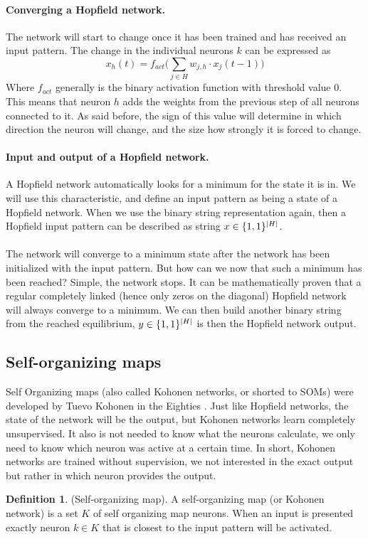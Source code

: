 \documentclass[pdftex,a4paper,12pt,twoside]{report}
\theoremstyle{plain} \newtheorem{theorem}{Theorem} \newtheorem{proposition}{Proposition} \newtheorem{lemma}{Lemma} \newtheorem*{corollary}{Corollary}
\theoremstyle{definition} \newtheorem{definition}{Definition} \newtheorem{conjecture}{Conjecture} \newtheorem*{example}{Example} \newtheorem{algorithm}{Algorithm}
\theoremstyle{remark} \newtheorem*{remark}{Remark} \newtheorem*{note}{Note} \newtheorem{case}{Case}
\begin{document}
\paragraph{Converging a Hopfield network.}
The network will start to change once it has been trained and has received an input pattern. The change in the individual neurons $k$ can be expressed as
\begin{equation}
x_h(t) = f_{act} \bigg(\sum_{j \in H} w_{j,h} \cdot x_j(t-1)\bigg)
\end{equation} Where $f_{act}$ generally is the binary activation function with threshold value 0.\\This means that neuron $h$ adds the weights from the previous step of all neurons connected to it. As said before, the sign of this value will determine in which direction the neuron will change, and the size how strongly it is forced to change. 
\paragraph{Input and output of a Hopfield network.} A Hopfield network automatically looks for a minimum for the state it is in. We will use this characteristic, and define an input pattern as being a state of a Hopfield network. When we use the binary string representation again, then a Hopfield input pattern can be described as string $x \in \{\-1,1\}^{|H|}$.\\\\The network will converge to a minimum state after the network has been initialized with the input pattern. But how can we now that such a minimum has been reached? Simple, the network stops. It can be mathematically proven that a regular completely linked (hence only zeros on the diagonal) Hopfield network will always converge to a minimum. We can then build another binary string from the reached equilibrium, $y \in \{\-1,1\}^{|H|}$ is then the Hopfield network output.
\subsection{Self-organizing maps}
Self Organizing maps (also called Kohonen networks, or shorted to SOMs) were developed by Tuevo Kohonen in the Eighties  \citep{kohonen1982}. Just like Hopfield networks, the state of the network will be the output, but Kohonen networks learn completely unsupervised. It also is not needed to know what the neurons calculate, we only need to know which neuron was active at a certain time. In short, Kohonen networks are trained without supervision, we not interested in the exact output but rather in which neuron provides the output.
\begin{definition}
(Self-organizing map). A self-organizing map (or Kohonen network) is a set $K$ of self organizing map neurons. When an input is presented exactly neuron $k \in K$ that is closest to the input pattern will be activated.
\end{definition}
\end{document}
